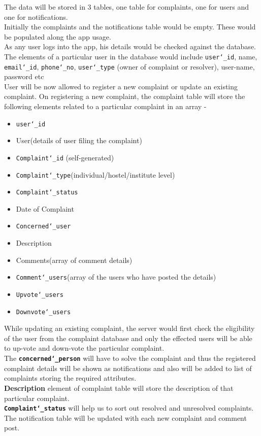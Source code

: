 \documentclass[a4paper]{article}
\begin{document}
The data will be stored in 3 tables, one table for complaints, one for users and one for notifications.\\ 
Initially the complaints and the notifications table would be empty. These would be populated along the app usage.\\
As any user logs into the app, his details would be checked against the database. The elements of a particular user in the database would include \texttt{user\char`_id}, name, \texttt{email\char`_id}, \texttt{phone\char`_no}, \texttt{user\char`_type} (owner of complaint or resolver), user-name, password etc \\
User will be now allowed to register a new complaint or update an existing complaint. On registering a new complaint, the complaint table will store the following elements related to a particular complaint in an array - 
\begin{itemize}
\renewcommand\labelitemi{--}
\item \texttt{user\char`_id}
\item User(details of user filing the complaint)
\item \texttt{Complaint\char`_id} (self-generated)
\item \texttt{Complaint\char`_type}(individual/hostel/institute level)
\item \texttt{Complaint\char`_status}
\item Date of Complaint
\item \texttt{Concerned\char`_user}
\item Description
\item Comments(array of comment details)
\item \texttt{Comment\char`_users}(array of the users who have posted the details)
\item \texttt{Upvote\char`_users}
\item \texttt{Downvote\char`_users}

\end{itemize} 

While updating an existing complaint, the server would first check the eligibility of the user from the complaint database and only the effected users will be able to up-vote and down-vote the particular complaint.\\
The \textbf{\texttt{concerned\char`_person}} will have to solve the complaint and thus the registered complaint details will be shown as notifications and also will be added to list of complaints storing the required attributes.\\
\textbf{Description} element of complaint table will store the description of that particular complaint.\\
\textbf{\texttt{Complaint\char`_status}} will help us to sort out resolved and unresolved complaints.\\
The notification table will be updated with each new complaint and comment post.\\
\end{document}
